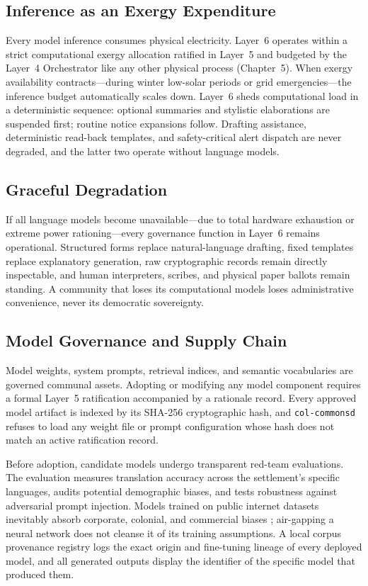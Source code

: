 \subsection{Inference as an Exergy Expenditure}

Every model inference consumes physical electricity. Layer~6 operates within a strict computational exergy allocation ratified in Layer~5 and budgeted by the Layer~4 Orchestrator like any other physical process (Chapter~5). When exergy availability contracts---during winter low-solar periods or grid emergencies---the inference budget automatically scales down. Layer~6 sheds computational load in a deterministic sequence: optional summaries and stylistic elaborations are suspended first; routine notice expansions follow. Drafting assistance, deterministic read-back templates, and safety-critical alert dispatch are never degraded, and the latter two operate without language models.

\subsection{Graceful Degradation}

If all language models become unavailable---due to total hardware exhaustion or extreme power rationing---every governance function in Layer~6 remains operational. Structured forms replace natural-language drafting, fixed templates replace explanatory generation, raw cryptographic records remain directly inspectable, and human interpreters, scribes, and physical paper ballots remain standing. A community that loses its computational models loses administrative convenience, never its democratic sovereignty.

\subsection{Model Governance and Supply Chain}

Model weights, system prompts, retrieval indices, and semantic vocabularies are governed communal assets. Adopting or modifying any model component requires a formal Layer~5 ratification accompanied by a rationale record. Every approved model artifact is indexed by its SHA-256 cryptographic hash, and \texttt{col-commonsd} refuses to load any weight file or prompt configuration whose hash does not match an active ratification record.

Before adoption, candidate models undergo transparent red-team evaluations. The evaluation measures translation accuracy across the settlement's specific languages, audits potential demographic biases, and tests robustness against adversarial prompt injection. Models trained on public internet datasets inevitably absorb corporate, colonial, and commercial biases \parencite{bender2021parrots,noble2018}; air-gapping a neural network does not cleanse it of its training assumptions. A local corpus provenance registry logs the exact origin and fine-tuning lineage of every deployed model, and all generated outputs display the identifier of the specific model that produced them.

